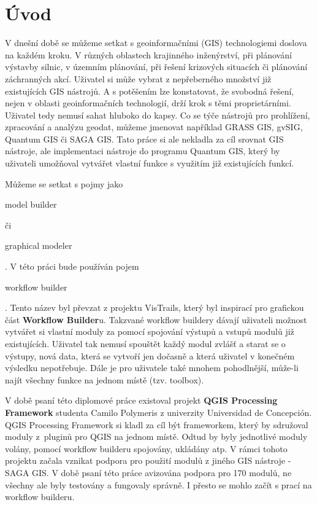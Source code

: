 \chapter*{Úvod}

V dnešní době se můžeme setkat s  geoinformačními (GIS)
technologiemi doslova na každém kroku. V různých oblastech krajinného
inženýrství, při plánování výstavby silnic, v územním plánování, při
řešení krizových situacích či plánování záchranných akcí. Uživatel si
může vybrat z nepřeberného množství již existujících GIS nástrojů. A s
potěšením lze konstatovat, že svobodná řešení, nejen v oblasti
geoinformačních technologií, drží krok s těmi proprietárními. Uživatel
tedy nemusí sahat hluboko do kapsy. Co se týče nástrojů pro
prohlížení, zpracování a analýzu  geodat, můžeme
jmenovat například GRASS GIS, gvSIG, Quantum GIS či SAGA GIS. Tato
práce si ale nekladla za cíl srovnat GIS nástroje, ale implementaci
nástroje do programu Quantum GIS, který by uživateli umožňoval
vytvářet vlastní funkce s využitím již existujících funkcí.

Můžeme se setkat s pojmy jako \begin{scriptsize}model
  builder\end{scriptsize} či \begin{scriptsize}graphical
    modeler\end{scriptsize}. V této práci bude používán
    pojem \begin{scriptsize}workflow builder\end{scriptsize}. Tento
      název byl převzat z projektu  VisTrails, který
      byl inspirací pro grafickou část \textbf{Workflow
        Builder}u. Takzvané workflow buildery dávají uživateli možnost
      vytvářet si vlastní moduly za pomocí spojování výstupů a vstupů
      modulů již existujících. Uživatel tak nemusí spouštět každý
      modul zvlášť a starat se o výstupy, nová data, která se vytvoří
      jen dočasně a která uživatel v konečném výsledku
      nepotřebuje. Dále je pro uživatele také mnohem pohodlnější,
      může-li najít všechny funkce na jednom místě (tzv. toolbox).


V době psaní této diplomové práce existoval projekt  \textbf{QGIS Processing Framework} studenta
Camilo Polymeris z univerzity Universidad de Concepción. QGIS
Processing Framework si kladl za cíl být frameworkem, který by
sdružoval moduly z~pluginů pro QGIS na jednom místě. Odtud by byly
jednotlivé moduly volány, pomocí workflow builderu spojovány, ukládány
atp. V rámci tohoto projektu začala vznikat podpora pro použití modulů
z jiného GIS nástroje -  SAGA GIS. V době psaní této
práce avizována podpora pro 170 modulů, ne všechny ale byly testovány
a fungovaly správně. I přesto se mohlo začít s prací na workflow
builderu.

